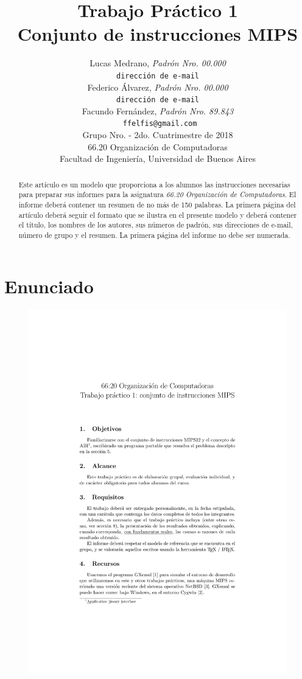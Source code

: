 \documentclass[a4paper, 12pt]{article}
\title{		\textbf{Trabajo Práctico 1}\\
			\textbf{Conjunto de instrucciones MIPS}
			}
\author{	Lucas Medrano, \textit{Padrón Nro. 00.000}                     	\\
            \texttt{ dirección de e-mail }                           		\\
            Federico Álvarez, \textit{Padrón Nro. 00.000}                 	\\
            \texttt{ dirección de e-mail }                                 	\\
            Facundo Fernández, \textit{Padrón Nro. 89.843}              	\\
            \texttt{ ffelfis@gmail.com}                                   	\\[2.5ex]
            \normalsize{Grupo Nro. \quad - 2do. Cuatrimestre de 2018}      	\\
            \normalsize{66.20 Organización de Computadoras}               	\\
            \normalsize{Facultad de Ingeniería, Universidad de Buenos Aires}\\
       }
\date{}
\begin{document}
	\maketitle
	\thispagestyle{empty}
	\begin{abstract}
		Este artículo es un modelo que proporciona a los alumnos las instrucciones necesarias para preparar sus informes para la asignatura \textit{66.20 Organización de Computadoras}. El informe deberá contener un resumen de no más de 150 palabras. La primera página del artículo deberá seguir el formato que se ilustra en el presente modelo y deberá contener el título, los nombres de los autores, sus números de padrón, sus direcciones de e-mail, número de grupo y el resumen. La primera página del informe no debe ser numerada.
	\end{abstract}
	
	\pagebreak
	\thispagestyle{empty}
	\tableofcontents
	\newpage
	
	\setcounter{page}{1}
	
	\section{Enunciado}
	\begin{figure}[H]
		\centering
		\includegraphics[scale=1, page = 1, clip, trim=20mm 36mm 20mm 35mm]{files/enunciado.pdf}
	\end{figure}
	
\end{document}
